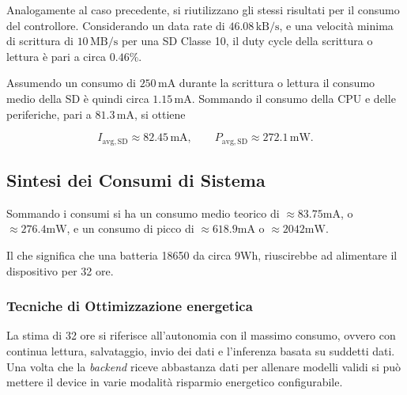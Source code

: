 Analogamente al caso precedente, si riutilizzano gli stessi risultati per il
consumo del controllore. Considerando un data rate di
\(46.08\,\mathrm{kB/s}\), e una velocità minima di scrittura di
\(10\,\mathrm{MB/s}\) per una SD Classe 10, il duty cycle della scrittura o lettura è
pari a circa \(0.46\%\).

Assumendo un consumo di \(250\,\mathrm{mA}\) durante la scrittura o lettura il consumo
medio della SD è quindi circa \(1.15\,\mathrm{mA}\). Sommando il consumo
della CPU e delle periferiche, pari a \(81.3\,\mathrm{mA}\), si ottiene

\begin{equation}
	I_{\mathrm{avg,SD}}\approx82.45\,\mathrm{mA},
	\qquad
	P_{\mathrm{avg,SD}}\approx\boxed{272.1\,\mathrm{mW}}.
\end{equation}

\subsection{Sintesi dei Consumi di Sistema}
Sommando i consumi si ha un consumo medio teorico di $\approx83.75\mathrm{mA}$, o $\approx276.4\mathrm{mW}$, e un consumo di picco di $\approx 618.9\mathrm{mA}$ o $\approx2042\mathrm{mW}$.

Il che significa che una batteria 18650 da circa 9Wh, riuscirebbe ad alimentare il dispositivo per 32 ore.

\subsubsection{Tecniche di Ottimizzazione energetica}
La stima di 32 ore si riferisce all'autonomia con il massimo consumo, ovvero con continua lettura, salvataggio, invio dei dati e l'inferenza basata su suddetti dati.
Una volta che la \textit{backend} riceve abbastanza dati per allenare modelli validi si può mettere il device in varie modalità risparmio energetico configurabile. %


